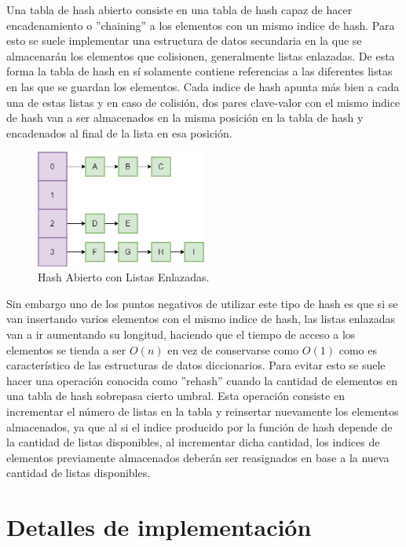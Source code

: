 \documentclass[titlepage,a4paper]{article}
\begin{document}
Una tabla de hash abierto consiste en una tabla de hash capaz de hacer
encadenamiento o ''chaining'' a los elementos con un mismo indice de hash. Para
esto se suele implementar una estructura de datos secundaria en la que se
almacenarán los elementos que colisionen, generalmente listas enlazadas. De
esta forma la tabla de hash en sí solamente contiene referencias a las
diferentes listas en las que se guardan los elementos. Cada indice de hash
apunta más bien a cada una de estas listas y en caso de colisión, dos pares
clave-valor con el mismo indice de hash van a ser almacenados en la misma
posición en la tabla de hash y encadenados al final de la lista en esa
posición.

\begin{figure}[H]
\centering
\includegraphics[width=0.5\textwidth]{img/2_hash_abierto.png}
\caption{\label{fig:seq02}Hash Abierto con Listas Enlazadas.}
\end{figure}

Sin embargo uno de los puntos negativos de utilizar este tipo de hash es que
si se van insertando varios elementos con el mismo indice de hash, las listas
enlazadas van a ir aumentando su longitud, haciendo que el tiempo de acceso a
los elementos se tienda a ser $O(n)$ en vez de conservarse como $O(1)$ como es
característico de las estructuras de datos diccionarios. Para evitar esto se
suele hacer una operación conocida como ''rehash'' cuando la cantidad de
elementos en una tabla de hash sobrepasa cierto umbral. Esta operación consiste
en incrementar el número de listas en la tabla y reinsertar nuevamente los
elementos almacenados, ya que al si el indice producido por la función de hash
depende de la cantidad de listas disponibles, al incrementar dicha cantidad,
los indices de elementos previamente almacenados deberán ser reasignados en
base a la nueva cantidad de listas disponibles.


				 \section{Detalles de implementación}\label{sec:implementacion}
\end{document}
